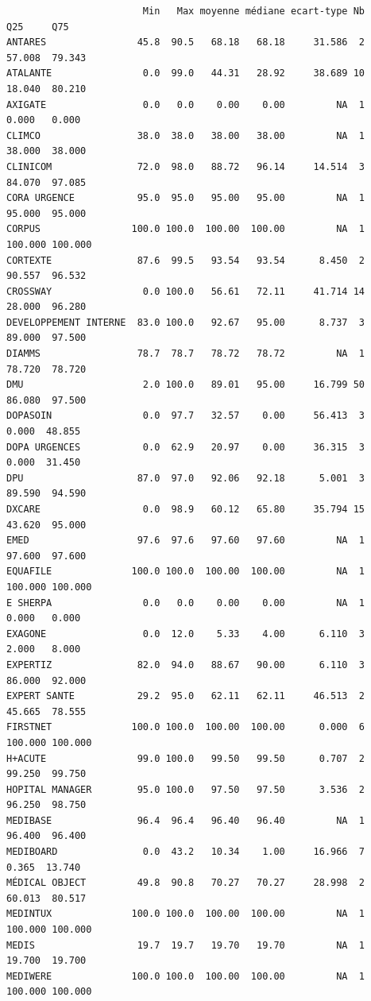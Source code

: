 \documentclass[]{article}
\begin{document}
\begin{verbatim}
                        Min   Max moyenne médiane ecart-type Nb     Q25     Q75
ANTARES                45.8  90.5   68.18   68.18     31.586  2  57.008  79.343
ATALANTE                0.0  99.0   44.31   28.92     38.689 10  18.040  80.210
AXIGATE                 0.0   0.0    0.00    0.00         NA  1   0.000   0.000
CLIMCO                 38.0  38.0   38.00   38.00         NA  1  38.000  38.000
CLINICOM               72.0  98.0   88.72   96.14     14.514  3  84.070  97.085
CORA URGENCE           95.0  95.0   95.00   95.00         NA  1  95.000  95.000
CORPUS                100.0 100.0  100.00  100.00         NA  1 100.000 100.000
CORTEXTE               87.6  99.5   93.54   93.54      8.450  2  90.557  96.532
CROSSWAY                0.0 100.0   56.61   72.11     41.714 14  28.000  96.280
DEVELOPPEMENT INTERNE  83.0 100.0   92.67   95.00      8.737  3  89.000  97.500
DIAMMS                 78.7  78.7   78.72   78.72         NA  1  78.720  78.720
DMU                     2.0 100.0   89.01   95.00     16.799 50  86.080  97.500
DOPASOIN                0.0  97.7   32.57    0.00     56.413  3   0.000  48.855
DOPA URGENCES           0.0  62.9   20.97    0.00     36.315  3   0.000  31.450
DPU                    87.0  97.0   92.06   92.18      5.001  3  89.590  94.590
DXCARE                  0.0  98.9   60.12   65.80     35.794 15  43.620  95.000
EMED                   97.6  97.6   97.60   97.60         NA  1  97.600  97.600
EQUAFILE              100.0 100.0  100.00  100.00         NA  1 100.000 100.000
E SHERPA                0.0   0.0    0.00    0.00         NA  1   0.000   0.000
EXAGONE                 0.0  12.0    5.33    4.00      6.110  3   2.000   8.000
EXPERTIZ               82.0  94.0   88.67   90.00      6.110  3  86.000  92.000
EXPERT SANTE           29.2  95.0   62.11   62.11     46.513  2  45.665  78.555
FIRSTNET              100.0 100.0  100.00  100.00      0.000  6 100.000 100.000
H+ACUTE                99.0 100.0   99.50   99.50      0.707  2  99.250  99.750
HOPITAL MANAGER        95.0 100.0   97.50   97.50      3.536  2  96.250  98.750
MEDIBASE               96.4  96.4   96.40   96.40         NA  1  96.400  96.400
MEDIBOARD               0.0  43.2   10.34    1.00     16.966  7   0.365  13.740
MÉDICAL OBJECT         49.8  90.8   70.27   70.27     28.998  2  60.013  80.517
MEDINTUX              100.0 100.0  100.00  100.00         NA  1 100.000 100.000
MEDIS                  19.7  19.7   19.70   19.70         NA  1  19.700  19.700
MEDIWERE              100.0 100.0  100.00  100.00         NA  1 100.000 100.000

\end{verbatim}
\end{document}
